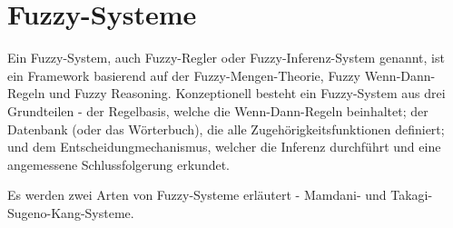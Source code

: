 %
%
%

\section{Fuzzy-Systeme}\label{fuzzy_systeme}

Ein Fuzzy-System, auch Fuzzy-Regler oder Fuzzy-Inferenz-System genannt, ist ein Framework basierend auf der Fuzzy-Mengen-Theorie, Fuzzy Wenn-Dann-Regeln und Fuzzy Reasoning. Konzeptionell besteht ein Fuzzy-System aus drei Grundteilen - der Regelbasis, welche die Wenn-Dann-Regeln beinhaltet; der Datenbank (oder das Wörterbuch), die alle Zugehörigkeitsfunktionen definiert; und dem Entscheidungmechanismus, welcher die Inferenz durchführt und eine angemessene Schlussfolgerung erkundet.   

Es werden zwei Arten von Fuzzy-Systeme erläutert - Mamdani- und Takagi-Sugeno-Kang-Systeme.


